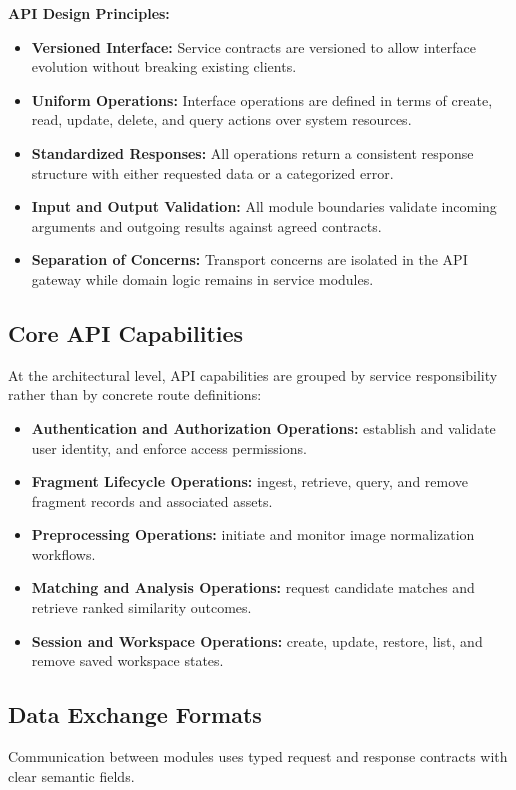 \documentclass[12pt, titlepage]{article}
\begin{document}
\textbf{API Design Principles:}
\begin{itemize}
  \item \textbf{Versioned Interface:} Service contracts are versioned to allow interface evolution without breaking existing clients.
  \item \textbf{Uniform Operations:} Interface operations are defined in terms of create, read, update, delete, and query actions over system resources.
  \item \textbf{Standardized Responses:} All operations return a consistent response structure with either requested data or a categorized error.
  \item \textbf{Input and Output Validation:} All module boundaries validate incoming arguments and outgoing results against agreed contracts.
  \item \textbf{Separation of Concerns:} Transport concerns are isolated in the API gateway while domain logic remains in service modules.
\end{itemize}

\subsection{Core API Capabilities}
At the architectural level, API capabilities are grouped by service responsibility rather than by concrete route definitions:
\begin{itemize}
  \item \textbf{Authentication and Authorization Operations:} establish and validate user identity, and enforce access permissions.
  \item \textbf{Fragment Lifecycle Operations:} ingest, retrieve, query, and remove fragment records and associated assets.
  \item \textbf{Preprocessing Operations:} initiate and monitor image normalization workflows.
  \item \textbf{Matching and Analysis Operations:} request candidate matches and retrieve ranked similarity outcomes.
  \item \textbf{Session and Workspace Operations:} create, update, restore, list, and remove saved workspace states.
\end{itemize}

\subsection{Data Exchange Formats}
Communication between modules uses typed request and response contracts with clear semantic fields.
\end{document}
